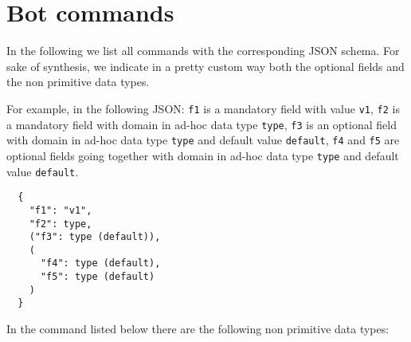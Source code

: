 \section{Bot commands}
\label{sec:bot-commands}

In the following we list all commands with the corresponding JSON schema.
For sake of synthesis, we indicate in a pretty custom way both the optional fields and the non primitive data types.

For example, in the following JSON: \texttt{f1} is a mandatory field with value \texttt{v1}, \texttt{f2} is a mandatory field with domain in ad-hoc data type \texttt{type}, \texttt{f3} is an optional field with domain in ad-hoc data type \texttt{type} and default value \texttt{default}, \texttt{f4} and \texttt{f5} are optional fields going together with domain in ad-hoc data type \texttt{type} and default value \texttt{default}.

\begin{verbatim}
  {
    "f1": "v1",
    "f2": type,
    ("f3": type (default)),
    (
      "f4": type (default),
      "f5": type (default)
    )
  }
\end{verbatim}

In the command listed below there are the following non primitive data types:

